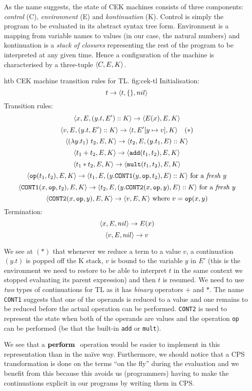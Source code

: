 \documentclass[class=article, crop=false]{standalone}
\begin{document}
As the name suggests, the state of CEK machines consists of three components:
\emph{control} (C), \emph{environment} (E) and \emph{kontinuation} (K). Control
is simply the program to be evaluated in its abstract syntax tree form.
Environment is a mapping from variable names to values (in our case, the natural
numbers) and kontinuation is a \emph{stack of closures} representing the rest
of the program to be interpreted at any given time. Hence a configuration of the
machine is characterised by a three-tuple $\langle C, E, K \rangle$.

\begin{myfigure}[.9]{htb}
{CEK machine transition rules for TL.}
{fig:cek-tl}
%
Initialisation:
$$ t \to \langle t, \{\}, nil \rangle $$
%
Transition rules:
$$ \langle x, E, (y.t, E') :: K \rangle \to \langle E(x), E, K \rangle $$
$$ \langle v, E, (y.t, E') :: K \rangle \to \langle t, E'[y \mapsto v], K \rangle \quad (*)$$
$$ \langle (\lambda y. t_1)\ t_2, E, K \rangle \to \langle t_2, E, (y.t_1, E) :: K \rangle $$
$$ \langle t_1 + t_2, E, K \rangle \to \langle \mathtt{add}(t_1, t_2), E, K \rangle $$
$$ \langle t_1 * t_2, E, K \rangle \to \langle \mathtt{mult}(t_1, t_2), E, K \rangle $$
$$ \langle \mathtt{op}(t_1, t_2), E, K \rangle \to \langle t_1, E, (y.\mathtt{CONT1}(y, \mathtt{op}, t_2), E) :: K \rangle \text{ for a \emph{fresh} $y$} $$
$$ \langle \mathtt{CONT1}(x, \mathtt{op}, t_2), E, K \rangle \to \langle t_2, E, (y.\mathtt{CONT2}(x, \mathtt{op}, y), E) :: K \rangle \text{ for a \emph{fresh} $y$} $$
$$ \langle \mathtt{CONT2}(x, \mathtt{op}, y), E, K \rangle \to \langle v, E, K \rangle \text{ where } v = \mathtt{op}(x, y) $$
%
Termination:
$$ \langle x, E, nil \rangle \to E(x) $$
$$ \langle v, E, nil \rangle \to v $$
\end{myfigure}

We see at $(*)$ that whenever we reduce a term to a value $v$, a continuation
$(y.t)$ is popped off the K stack, $v$ is bound to the variable $y$ in $E'$
(this is the environment we need to restore to be able to interpret $t$ in the
same context we stopped evaluating its parent expression) and then $t$ is
resumed. We need to use \emph{two} types of continuations for TL as it has
\emph{binary} operators $+$ and $*$. The name \texttt{CONT1} suggests that one
of the operands is reduced to a value and one remains to be reduced before the
actual operation can be performed. \texttt{CONT2} is used to represent the state
when both of the operands are values and the operation \texttt{op} can be
performed (be that the built-in \texttt{add} or \texttt{mult}).

We see that a $\mathbf{perform}\ $ operation would be easier to implement in this
representation than in the naïve way. Furthermore, we should notice that a CPS
transformation is done on the terms ``on the fly'' during the evaluation and we
benefit from this because this avoids us (programmers) having to make the
continuations explicit in our programs by writing them in CPS.
\end{document}
